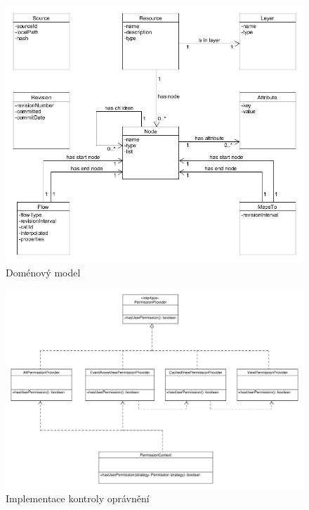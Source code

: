 \documentclass[11pt,twoside,a4paper]{book}
\begin{document}
\begin{figure}
\begin{center}
\includegraphics[width=14cm]{figures/domain_model}
\caption{Doménový model}
\label{fig:impl-domain}
\end{center}
\end{figure}

\begin{figure}
\begin{center}
\includegraphics[width=1.3\linewidth, angle=90]{figures/permission-class}
\caption{Implementace kontroly oprávnění}
\label{fig:impl-permission}
\end{center}
\end{figure}
\end{document}
